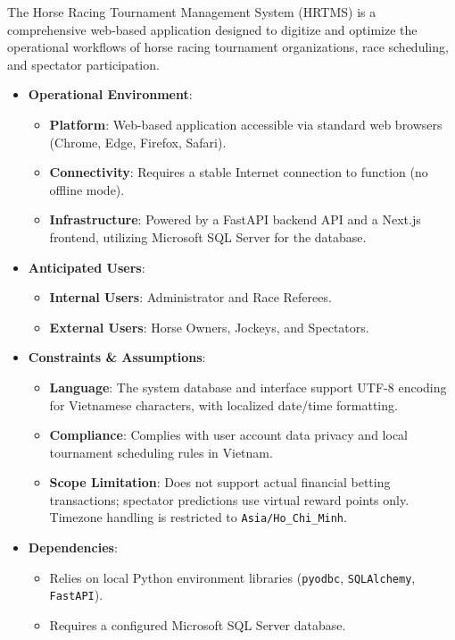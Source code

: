The Horse Racing Tournament Management System (HRTMS) is a comprehensive web-based application designed to digitize and optimize the operational workflows of horse racing tournament organizations, race scheduling, and spectator participation.

\begin{itemize}
    \item \textbf{Operational Environment}:
    \begin{itemize}
        \item \textbf{Platform}: Web-based application accessible via standard web browsers (Chrome, Edge, Firefox, Safari).
        \item \textbf{Connectivity}: Requires a stable Internet connection to function (no offline mode).
        \item \textbf{Infrastructure}: Powered by a FastAPI backend API and a Next.js frontend, utilizing Microsoft SQL Server for the database.
    \end{itemize}
    
    \item \textbf{Anticipated Users}:
    \begin{itemize}
        \item \textbf{Internal Users}: Administrator and Race Referees.
        \item \textbf{External Users}: Horse Owners, Jockeys, and Spectators.
    \end{itemize}
    
    \item \textbf{Constraints \& Assumptions}:
    \begin{itemize}
        \item \textbf{Language}: The system database and interface support UTF-8 encoding for Vietnamese characters, with localized date/time formatting.
        \item \textbf{Compliance}: Complies with user account data privacy and local tournament scheduling rules in Vietnam.
        \item \textbf{Scope Limitation}: Does not support actual financial betting transactions; spectator predictions use virtual reward points only. Timezone handling is restricted to \texttt{Asia/Ho\_Chi\_Minh}.
    \end{itemize}
    
    \item \textbf{Dependencies}:
    \begin{itemize}
        \item Relies on local Python environment libraries (\texttt{pyodbc}, \texttt{SQLAlchemy}, \texttt{FastAPI}).
        \item Requires a configured Microsoft SQL Server database.
    \end{itemize}
\end{itemize}

